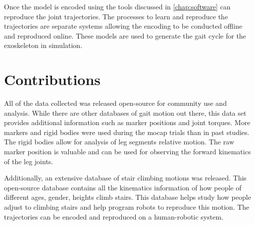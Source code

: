 Once the model is encoded using the tools discussed in \autoref{chap:software} can reproduce the joint trajectories. The processes to learn and reproduce the trajectories are separate systems allowing the encoding to be conducted offline and reproduced online. These models are used to generate the gait cycle for the exoskeleton in simulation. 


\section{Contributions}

All of the data collected was released open-source for community use and analysis. While there are other databases of gait motion out there, this data set provides additional information such as marker positions and joint torques. More markers and rigid bodies were used during the mocap trials than in past studies. The rigid bodies allow for analysis of leg segments relative motion. The raw marker position is valuable and can be used for observing the forward kinematics of the leg joints. 

Additionally, an extensive database of stair climbing motions was released. This open-source database contains all the kinematics information of how people of different ages, gender, heights climb stairs. This database helps study how people adjust to climbing stairs and help program robots to reproduce this motion. The trajectories can be encoded and reproduced on a human-robotic system. 
